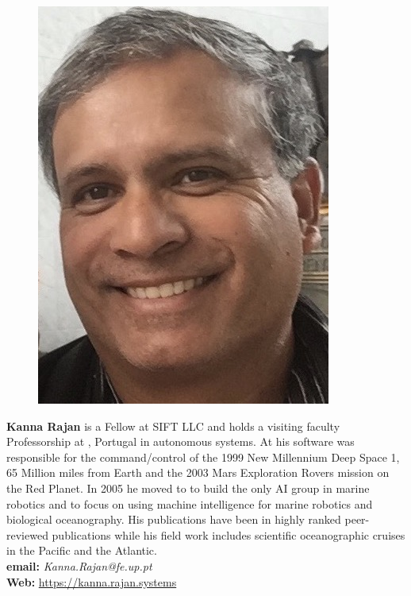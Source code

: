 \parbox{6.5in}{
\begin{figure} %
    \vspace{-\intextsep}
    \hspace*{-.35\columnsep}\includegraphics[scale=0.4]{fig/KRajan.jpg}
\end{figure}
\textbf{Kanna Rajan} is a Fellow at SIFT LLC and holds a visiting
faculty Professorship at \unive, Portugal in autonomous systems. At \nas
his software was responsible for the command/control of the 1999 New
Millennium Deep Space 1, 65 Million miles from Earth and the 2003 Mars
Exploration Rovers mission on the Red Planet. In 2005 he moved to \mba
to build the only AI group in marine robotics and to focus on using
machine intelligence for marine robotics and biological oceanography.
His publications have been in highly ranked peer-reviewed publications
while his field work includes scientific
oceanographic cruises in the Pacific and the Atlantic.\\

\textbf{email: }\emph{Kanna.Rajan@fe.up.pt}\\
\textbf{Web: }\url{https://kanna.rajan.systems}
}
